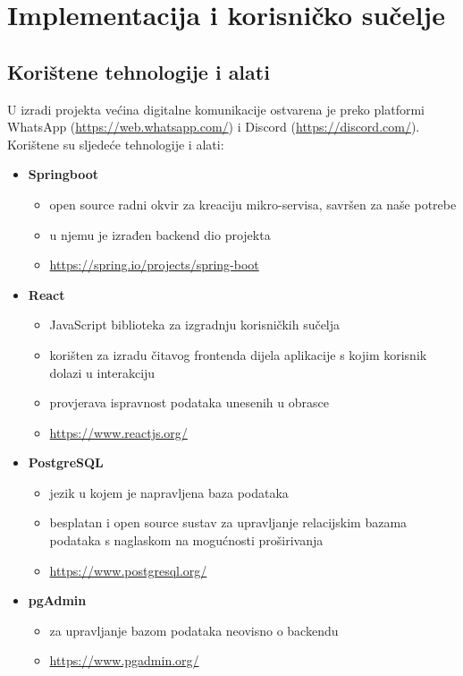 \chapter{Implementacija i korisničko sučelje}
		
		
		\section{Korištene tehnologije i alati}
		
			\indent U izradi projekta većina digitalne komunikacije ostvarena je preko platformi WhatsApp (\url{https://web.whatsapp.com/}) i Discord (\url{https://discord.com/}). Korištene su sljedeće tehnologije i alati:
			
			\begin{itemize}
				\item \textbf{Springboot}
				\begin{itemize}
					\item open source radni okvir za kreaciju mikro-servisa, savršen za naše potrebe
					\item u njemu je izrađen backend dio projekta
					\item \url{https://spring.io/projects/spring-boot}
				\end{itemize}
				
				\item \textbf{React}
				\begin{itemize}
					\item JavaScript biblioteka za izgradnju korisničkih sučelja
					\item korišten za izradu čitavog frontenda dijela aplikacije s kojim korisnik dolazi u interakciju
					\item provjerava ispravnost podataka unesenih u obrasce
					\item \url{https://www.reactjs.org/}
				\end{itemize}
				
				\item \textbf{PostgreSQL}
				\begin{itemize}
					\item jezik u kojem je napravljena baza podataka
					\item besplatan i open source sustav za upravljanje relacijskim bazama podataka s naglaskom na mogućnosti proširivanja
					\item \url{https://www.postgresql.org/}
				\end{itemize}
			
				\item \textbf{pgAdmin}
				\begin{itemize}
					\item za upravljanje bazom podataka neovisno o backendu
					\item \url{https://www.pgadmin.org/}
				\end{itemize}
			

\end{itemize}

